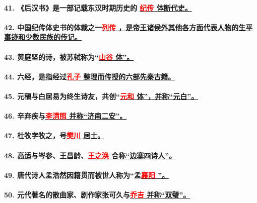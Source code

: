 \documentclass[UTF8]{ctexart} %
\begin{document}
\paragraph{41. 《后汉书》是一部记载东汉时期历史的 \uline{\quad \textcolor{red}{纪}\textcolor{red}{传} \quad 体断代史。}}
\paragraph{42. 中国纪传体史书的体裁之一\uline{\quad \textcolor{red}{列}\textcolor{red}{传} \quad ，是帝王诸侯外其他各方面代表人物的生平事迹和少数民族的传记。}}
\paragraph{43. 黄庭坚的诗，被苏轼称为“\uline{\quad \textcolor{red}{山}\textcolor{red}{谷} \quad 体”。}}
\paragraph{44. 六经，是指经过\uline{\quad \textcolor{red}{孔}\textcolor{red}{子} \quad 整理而传授的六部先秦古籍。}}
\paragraph{45. 元稹与白居易为终生诗友，共创“\uline{\quad \textcolor{red}{元}\textcolor{red}{和} \quad 体”，并称“元白”。}}
\paragraph{46. 辛弃疾与\uline{\quad \textcolor{red}{李}\textcolor{red}{清}\textcolor{red}{照} \quad 并称“济南二安”。}}
\paragraph{47. 杜牧字牧之，号\uline{\quad \textcolor{red}{樊}\textcolor{red}{川} \quad 居士。}}
\paragraph{48. 高适与岑参、王昌龄、\uline{\quad \textcolor{red}{王}\textcolor{red}{之}\textcolor{red}{涣} \quad 合称“边塞四诗人”。}}
\paragraph{49. 唐代诗人孟浩然因籍贯而被世人称为“孟\uline{\quad \textcolor{red}{襄}\textcolor{red}{阳} \quad”。}}
\paragraph{50. 元代著名的散曲家、剧作家张可久与\uline{\quad \textcolor{red}{乔}\textcolor{red}{吉} \quad 并称“双璧”。}}
\label{lastpage}
\end{document}
